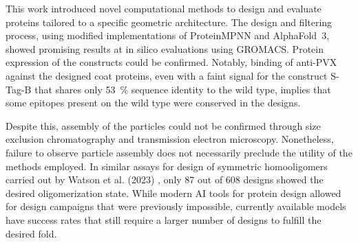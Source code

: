
This work introduced novel computational methods to design and evaluate proteins tailored to a specific geometric architecture. The design and filtering process, using modified implementations of ProteinMPNN and AlphaFold~3, showed promising results at in silico evaluations using GROMACS. Protein expression of the constructs could be confirmed. Notably, binding of anti-PVX against the designed coat proteins, even with a faint signal for the construct S-Tag-B that shares only \SI{53}{\percent} sequence identity to the wild type, implies that some epitopes present on the wild type were conserved in the designs.

Despite this, assembly of the particles could not be confirmed through size exclusion chromatography and transmission electron microscopy. Nonetheless, failure to observe particle assembly does not necessarily preclude the utility of the methods employed. In similar assays for design of symmetric homooligomers carried out by Watson et al. (2023) \cite{RFdiffusion}, only 87 out of 608 designs showed the desired oligomerization state. While modern AI tools for protein design allowed for design campaigns that were previously impossible, currently available models have success rates that still require a larger number of designs to fulfill the desired fold. 

